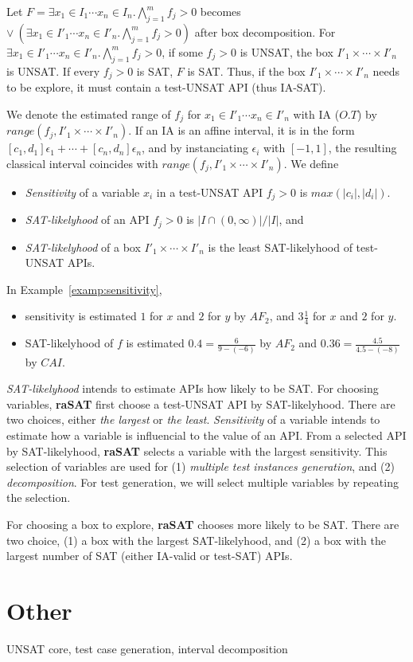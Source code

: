 Let $F = \exists x_1 \in I_1 \cdots x_n \in I_n. \bigwedge \limits_{j=1}^m f_j > 0$ 
becomes $\vee~( \exists x_1 \in I'_1 \cdots x_n \in I'_n. \bigwedge \limits_{j=1}^m f_j > 0)$ 
after box decomposition. 
For $\exists x_1 \in I'_1 \cdots x_n \in I'_n. \bigwedge \limits_{j=1}^m f_j > 0$, 
if some $f_j > 0$ is UNSAT, the box $I'_1 \times \cdots \times I'_n$ is UNSAT. 
If every $f_j > 0$ is SAT, $F$ is SAT. 
Thus, if the box $I'_1 \times \cdots \times I'_n$ needs to be explore, it must contain 
a test-UNSAT API (thus IA-SAT). 

We denote the estimated range of $f_j$ for $x_1 \in I'_1 \cdots x_n \in I'_n$ with IA ($O.T$)
by $range(f_j, I'_1 \times \cdots \times I'_n)$. 
If an IA is an affine interval, 
it is in the form $[c_1,d_1]\epsilon_1 + \cdots + [c_n,d_n]\epsilon_n$, 
and by instanciating $\epsilon_i$ with $[-1,1]$, 
the resulting classical interval coincides with $range(f_j, I'_1 \times \cdots \times I'_n)$. 
We define 
\begin{itemize} 
\item {\em Sensitivity} of a variable $x_i$ in a test-UNSAT API $f_j > 0$ is $max(|c_i|, |d_i|)$. 
\item {\em SAT-likelyhood} of an API $f_j > 0$ is $| I \cap (0,\infty) | / |I|$, and 
\item {\em SAT-likelyhood} of a box $I'_1 \times \cdots \times I'_n$ is 
the least SAT-likelyhood of test-UNSAT APIs. 
\end{itemize} 

\begin{example} \label{examp:SATlikelyhood}
In Example~\ref{examp:sensitivity}, 
\begin{itemize}
\item sensitivity is estimated $1$ for $x$ and $2$ for $y$ by $AF_2$, and $3\frac{1}{4}$ for $x$ and 
$2$ for $y$. 
\item SAT-likelyhood of $f$ is estimated $0.4= \frac{6}{9-(-6)}$ by $AF_2$ 
and $0.36 = \frac{4.5}{4.5-(-8)}$ by $CAI$. 
\end{itemize}
\end{example}


{\em SAT-likelyhood} intends to estimate APIs how likely to be SAT. 
For choosing variables, {\bf raSAT} first choose a test-UNSAT API by SAT-likelyhood. 
There are two choices, either {\em the largest} or {\em the least}. 
{\em Sensitivity} of a variable intends to estimate how a variable is influencial to the value of an API. 
From a selected API by SAT-likelyhood, {\bf raSAT} selects a variable with the largest sensitivity. 
This selection of variables are used for (1) {\em multiple test instances generation}, and 
(2) {\em decomposition}. 
For test generation, we will select multiple variables by repeating the selection. 

For choosing a box to explore, {\bf raSAT} chooses more likely to be SAT. 
There are two choice, (1) a box with the largest SAT-likelyhood, and 
(2) a box with the largest number of SAT (either IA-valid or test-SAT) APIs.

\section{Other}
UNSAT core, test case generation, interval decomposition 